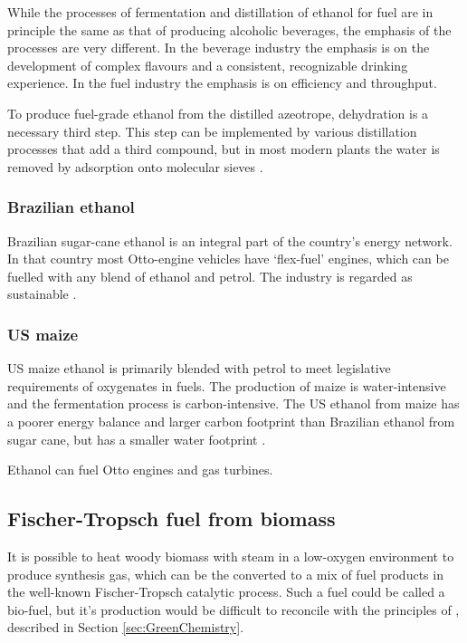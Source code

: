 While the processes of fermentation and distillation of ethanol for fuel are in
principle the same as that of producing alcoholic beverages, the emphasis of the
processes are very different. In the beverage industry the emphasis is on the
development of complex flavours and a consistent, recognizable drinking 
experience. In the fuel industry the emphasis is on efficiency and throughput.

To produce fuel-grade ethanol from the distilled azeotrope, dehydration is a
necessary third step. This step can be implemented by various distillation
processes that add a third compound, but in most modern plants the water is
removed by adsorption onto molecular sieves \autocite{Kumar2010}.

\subsubsection{Brazilian ethanol}

Brazilian sugar-cane ethanol is an integral part of the country's energy
network. In that country most Otto-engine vehicles have `flex-fuel' engines,
which can be fuelled with any blend of ethanol and petrol. The industry is
regarded as sustainable \autocite{Smeets2006}.

\subsubsection{US maize}

US maize ethanol is primarily blended with petrol to meet legislative
requirements of oxygenates in fuels. The production of maize is water-intensive
and the fermentation process is carbon-intensive. The US ethanol from maize has
a poorer energy balance and larger carbon footprint than Brazilian ethanol from
sugar cane, but has a smaller water footprint \autocite{Mekonnen2018}.

Ethanol can fuel Otto engines and gas turbines. 

\subsection{Fischer-Tropsch fuel from biomass}
\label{sec:FT}

It is possible to heat woody biomass with steam in a low-oxygen environment to
produce synthesis gas, which can be the converted to a mix of fuel products in
the well-known Fischer-Tropsch catalytic process. Such a  fuel could be called a
bio-fuel, but it's production would be difficult to reconcile with the
principles of , described in Section
\ref{sec:GreenChemistry}.

